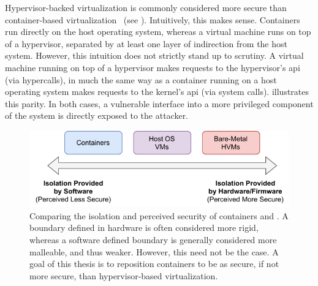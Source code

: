 \documentclass[
  fontsize=12pt,
  titlepage=firstiscover,
  paper=letter,
oneside,
  cleardoublepage=plain,
  parskip=half-,
  DIV=10,
  parindent,
  appendixprefix,
  chapterprefix,
  listof=totoc,
]{scrbook}
\begin{document}
Hypervisor-backed virtualization is commonly considered more secure than
con\-tain\-er-based virtualization~\cite{sultan2019_container_security,
eder2016_hypervisor_container} (see ). Intuitively, this
makes sense.  Containers run directly on the host operating system, whereas a virtual
machine runs on top of a hypervisor, separated by at least one layer of indirection from
the host system.  However, this intuition does not strictly stand up to scrutiny.
A virtual machine running on top of a hypervisor makes requests to the hypervisor's
\gls{api} (via hypercalls), in much the same way as a container running on a host
operating system makes requests to the kernel's \gls{api} (via system calls).
 illustrates this parity. In both cases, a vulnerable
interface into a more privileged component of the system is directly exposed to the
attacker.

\begin{figure}[htbp]
  \centering
  \includegraphics[width=0.8\linewidth]{figs/confinement-problem/security.pdf}
  \caption[Comparing the isolation and perceived security of containers and ]{
    Comparing the isolation and perceived security of containers and
    . A boundary defined in hardware is often considered more rigid,
    whereas a software defined boundary is generally considered more malleable, and thus
    weaker. However, this need not be the case. A goal of this thesis is to reposition
    containers to be as secure, if not more secure, than hypervisor-based virtualization.
  }\label{fig:container-hvm-security}
\end{figure}
\end{document}
